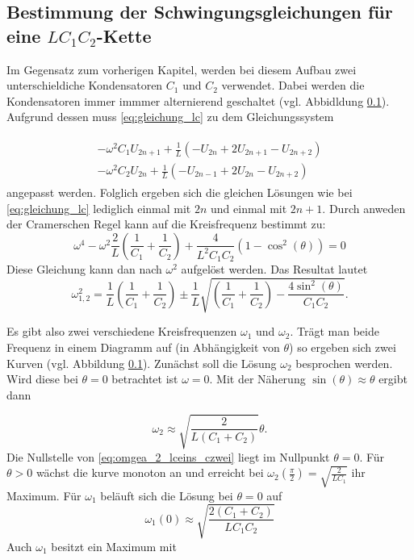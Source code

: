 \subsection{Bestimmung der Schwingungsgleichungen für eine $LC_1C_2$-Kette}
Im Gegensatz zum vorherigen Kapitel, werden bei diesem Aufbau zwei unterschieldiche 
Kondensatoren $C_1$ und $C_2$ verwendet. Dabei werden die Kondensatoren immer
immmer alternierend geschaltet (vgl. Abbidldung \ref{}).
Aufgrund dessen muss \eqref{eq:gleichung_lc} zu dem Gleichungssystem

\begin{align}
\label{eq:lc1c2_gleichungsy}
\begin{aligned}
-\omega^2C_1U_{2n+1}+\frac{1}{L}\left(-U_{2n}+2U_{2n+1}-U_{2n+2}\right)\\
-\omega^2C_2U_{2n}+\frac{1}{L}\left(-U_{2n-1}+2U_{2n}-U_{2n+2}\right)
\end{aligned}
\end{align}
angepasst werden.
Folglich ergeben sich die gleichen Lösungen wie bei \eqref{eq:gleichung_lc}
lediglich einmal mit $2n$ und einmal mit $2n+1$.
Durch anweden der Cramerschen Regel kann auf die Kreisfrequenz bestimmt 
zu:
\begin{equation*}
\omega^4-\omega^2\frac{2}{L}\left(\frac{1}{C_1}+\frac{1}{C_2}\right)+\frac{4}{L^2C_1C_2}\left(1-\cos^2(\theta)\right)=0
\end{equation*}
Diese Gleichung kann dan nach $\omega^2$ aufgelöst werden.
Das Resultat lautet
\begin{equation}
\label{eq:omgea_ceins_czwei}
\omega_{1,2}^{2}=\frac{1}{L}\left(\frac{1}{C_1}+\frac{1}{C_2}\right)\pm\frac{1}{L}\sqrt{\left(\frac{1}{C_1}+\frac{1}{C_2}\right)-\frac{4\sin^2(\theta)}{C_1C_2}}.
\end{equation}

Es gibt also zwei verschiedene Kreisfrequenzen $\omega_1$ und $\omega_2$.
Trägt man beide Frequenz in einem Diagramm auf (in Abhängigkeit von $\theta$) so ergeben sich 
zwei Kurven (vgl. Abbildung \ref{}). 
Zunächst soll die Lösung $\omega_2$ besprochen werden.
Wird diese bei $\theta=0$ betrachtet ist $\omega=0$.
Mit der Näherung $\sin(\theta)\approx\theta$ ergibt dann

\begin{equation}
\label{eq:omgea_2_lceins_czwei}
\omega_2\approx\sqrt{\frac{2}{L\left(C_1+C_2\right)}}\theta.
\end{equation}
Die Nullstelle von \eqref{eq:omgea_2_lceins_czwei} liegt im Nullpunkt $\theta=0$.
Für $\theta>0$ wächst die kurve monoton an und erreicht bei $\omega_2(\frac{\pi}{2})=\sqrt{\frac{2}{LC_1}}$
ihr Maximum.
Für $\omega_1$ beläuft sich die Lösung bei $\theta=0$ auf
\begin{equation*}
\omega_1(0)\approx\sqrt{\frac{2(C_1+C_2)}{LC_1C_2}}
\end{equation*}
Auch $\omega_1$ besitzt ein Maximum mit

